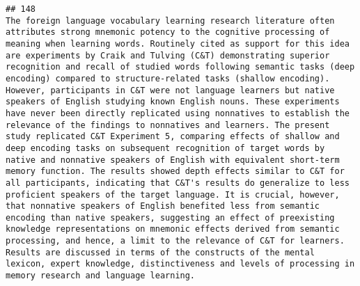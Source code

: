 \documentclass[
  english,
  man]{apa6}
\begin{document}
\begin{verbatim}
## 148                                                                                                                                                                                                                                                                                                                                                                                                                                                                                                                                                                                                                                                                                                                                                                                                                                                                                                                                                                                                                                                                                    The foreign language vocabulary learning research literature often attributes strong mnemonic potency to the cognitive processing of meaning when learning words. Routinely cited as support for this idea are experiments by Craik and Tulving (C&T) demonstrating superior recognition and recall of studied words following semantic tasks (deep encoding) compared to structure-related tasks (shallow encoding). However, participants in C&T were not language learners but native speakers of English studying known English nouns. These experiments have never been directly replicated using nonnatives to establish the relevance of the findings to nonnatives and learners. The present study replicated C&T Experiment 5, comparing effects of shallow and deep encoding tasks on subsequent recognition of target words by native and nonnative speakers of English with equivalent short-term memory function. The results showed depth effects similar to C&T for all participants, indicating that C&T's results do generalize to less proficient speakers of the target language. It is crucial, however, that nonnative speakers of English benefited less from semantic encoding than native speakers, suggesting an effect of preexisting knowledge representations on mnemonic effects derived from semantic processing, and hence, a limit to the relevance of C&T for learners. Results are discussed in terms of the constructs of the mental lexicon, expert knowledge, distinctiveness and levels of processing in memory research and language learning.

\end{verbatim}
\end{document}
